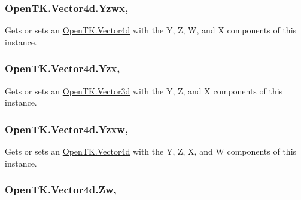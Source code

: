 \hypertarget{struct_open_t_k_1_1_vector4d_a89b53c3e716f7ff0897fd5b7d7e0d424}{
\subsubsection[{Yzwx}]{ Open\-T\-K.\-Vector4d.\-Yzwx\hspace{0.3cm}{\ttfamily [get]}, {\ttfamily [set]}}}\label{struct_open_t_k_1_1_vector4d_a89b53c3e716f7ff0897fd5b7d7e0d424}


Gets or sets an \hyperlink{struct_open_t_k_1_1_vector4d}{Open\-T\-K.\-Vector4d} with the Y, Z, W, and X components of this instance. 

\hypertarget{struct_open_t_k_1_1_vector4d_ab54c9a4d89cf6b492e5a24a1b1db6b50}{
\subsubsection[{Yzx}]{ Open\-T\-K.\-Vector4d.\-Yzx\hspace{0.3cm}{\ttfamily [get]}, {\ttfamily [set]}}}\label{struct_open_t_k_1_1_vector4d_ab54c9a4d89cf6b492e5a24a1b1db6b50}


Gets or sets an \hyperlink{struct_open_t_k_1_1_vector3d}{Open\-T\-K.\-Vector3d} with the Y, Z, and X components of this instance. 

\hypertarget{struct_open_t_k_1_1_vector4d_a8f2c1ac7c4cb21f032c1768d7221b9bf}{
\subsubsection[{Yzxw}]{ Open\-T\-K.\-Vector4d.\-Yzxw\hspace{0.3cm}{\ttfamily [get]}, {\ttfamily [set]}}}\label{struct_open_t_k_1_1_vector4d_a8f2c1ac7c4cb21f032c1768d7221b9bf}


Gets or sets an \hyperlink{struct_open_t_k_1_1_vector4d}{Open\-T\-K.\-Vector4d} with the Y, Z, X, and W components of this instance. 

\hypertarget{struct_open_t_k_1_1_vector4d_aea2374e451389525bd30e238249db5d1}{
\subsubsection[{Zw}]{ Open\-T\-K.\-Vector4d.\-Zw\hspace{0.3cm}{\ttfamily [get]}, {\ttfamily [set]}}}\label{struct_open_t_k_1_1_vector4d_aea2374e451389525bd30e238249db5d1}


